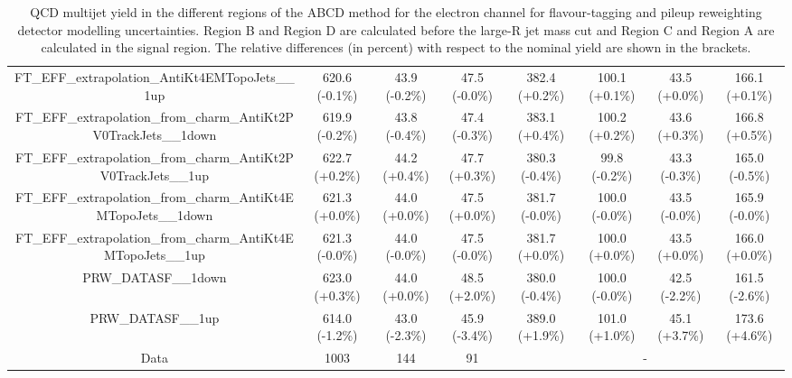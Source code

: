 \begin{table}[htbp!]
\begin{tiny}
\begin{center}
\begin{tabular}{c|c|c|c||c|c|c|c}
FT\_EFF\_extrapolation\_AntiKt4EMTopoJets\_\_1up             & 620.6     (-0.1\%) & 43.9      (-0.2\%) & 47.5      (-0.0\%) & 382.4     (+0.2\%) & 100.1     (+0.1\%) & 43.5      (+0.0\%) & 166.1     (+0.1\%) \\ 
FT\_EFF\_extrapolation\_from\_charm\_AntiKt2PV0TrackJets\_\_1down & 619.9     (-0.2\%) & 43.8      (-0.4\%) & 47.4      (-0.3\%) & 383.1     (+0.4\%) & 100.2     (+0.2\%) & 43.6      (+0.3\%) & 166.8     (+0.5\%) \\ 
FT\_EFF\_extrapolation\_from\_charm\_AntiKt2PV0TrackJets\_\_1up & 622.7     (+0.2\%) & 44.2      (+0.4\%) & 47.7      (+0.3\%) & 380.3     (-0.4\%) & 99.8      (-0.2\%) & 43.3      (-0.3\%) & 165.0     (-0.5\%) \\ 
FT\_EFF\_extrapolation\_from\_charm\_AntiKt4EMTopoJets\_\_1down & 621.3     (+0.0\%) & 44.0      (+0.0\%) & 47.5      (+0.0\%) & 381.7     (-0.0\%) & 100.0     (-0.0\%) & 43.5      (-0.0\%) & 165.9     (-0.0\%) \\ 
FT\_EFF\_extrapolation\_from\_charm\_AntiKt4EMTopoJets\_\_1up & 621.3     (-0.0\%) & 44.0      (-0.0\%) & 47.5      (-0.0\%) & 381.7     (+0.0\%) & 100.0     (+0.0\%) & 43.5      (+0.0\%) & 166.0     (+0.0\%) \\ 
PRW\_DATASF\_\_1down                                         & 623.0     (+0.3\%) & 44.0      (+0.0\%) & 48.5      (+2.0\%) & 380.0     (-0.4\%) & 100.0     (-0.0\%) & 42.5      (-2.2\%) & 161.5     (-2.6\%) \\ 
PRW\_DATASF\_\_1up                                           & 614.0     (-1.2\%) & 43.0      (-2.3\%) & 45.9      (-3.4\%) & 389.0     (+1.9\%) & 101.0     (+1.0\%) & 45.1      (+3.7\%) & 173.6     (+4.6\%) \\ 
\hline 
\hline 
Data                                                        & 1003  & 144   & 91  &\multicolumn{4}{c}{-} \\ 
\hline
\end{tabular}
\end{center}
\caption{QCD multijet yield in the different regions of the ABCD method for the electron channel for flavour-tagging and pileup reweighting 
detector modelling uncertainties. Region B and Region D are calculated before the large-R jet mass cut and Region C and Region A are 
calculated in the signal region. The relative differences (in percent) with respect to the nominal yield are shown in the brackets.} 
\label{tab:boosted_qcd_detsyst_elec_sr_2}
\end{tiny}
\end{table} 
